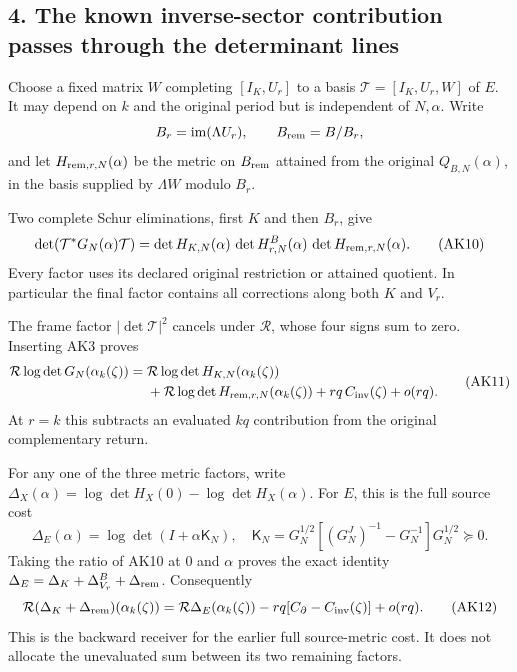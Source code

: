 \documentclass[11pt]{article}
\begin{document}
\subsection{4. The known inverse-sector contribution passes through the determinant lines}\label{the-known-inverse-sector-contribution-passes-through-the-determinant-lines}

Choose a fixed matrix \(W\) completing \([I_K,U_r]\) to a basis \(\mathcal T=[I_K,U_r,W]\) of \(E\). It may depend on \(k\) and the original period but is independent of \(N,\alpha\). Write \[
B_r=\operatorname{im}(\Lambda U_r),\qquad
B_{\rm rem}=B/B_r,
\] and let \(H_{{\rm rem},r,N}(\alpha)\) be the metric on \(B_{\rm rem}\) attained from the original \(Q_{B,N}(\alpha)\), in the basis supplied by \(\Lambda W\) modulo \(B_r\).

Two complete Schur eliminations, first \(K\) and then \(B_r\), give \[
\det(\mathcal T^*G_N(\alpha)\mathcal T)
=\det H_{K,N}(\alpha)\,
 \det H^B_{r,N}(\alpha)\,
 \det H_{{\rm rem},r,N}(\alpha).
\tag{AK10}
\] Every factor uses its declared original restriction or attained quotient. In particular the final factor contains all corrections along both \(K\) and \(V_r\).

The frame factor \(|\det\mathcal T|^2\) cancels under \(\mathcal R\), whose four signs sum to zero. Inserting AK3 proves \[
\begin{split}
\mathcal R\log\det G_N(\alpha_k(\zeta))
={}&\mathcal R\log\det H_{K,N}(\alpha_k(\zeta))\\
 &+\mathcal R\log\det H_{{\rm rem},r,N}(\alpha_k(\zeta))
 +rq\,C_{\rm inv}(\zeta)+o(rq).
\end{split}\tag{AK11}
\] At \(r=k\) this subtracts an evaluated \(kq\) contribution from the original complementary return.

For any one of the three metric factors, write \(\Delta_X(\alpha)=\log\det H_X(0)-\log\det H_X(\alpha)\). For \(E\), this is the full source cost \[
\Delta_E(\alpha)=\log\det(I+\alpha\mathsf K_N),\quad
\mathsf K_N=G_N^{1/2}[(G_N^J)^{-1}-G_N^{-1}]G_N^{1/2}\succeq0.
\] Taking the ratio of AK10 at \(0\) and \(\alpha\) proves the exact identity \(\Delta_E=\Delta_K+\Delta_{V_r}^B+\Delta_{\rm rem}\). Consequently \[
\mathcal R(\Delta_K+\Delta_{\rm rem})(\alpha_k(\zeta))
=\mathcal R\Delta_E(\alpha_k(\zeta))
-rq[C_\partial-C_{\rm inv}(\zeta)]+o(rq).
\tag{AK12}
\] This is the backward receiver for the earlier full source-metric cost. It does not allocate the unevaluated sum between its two remaining factors.
\end{document}
